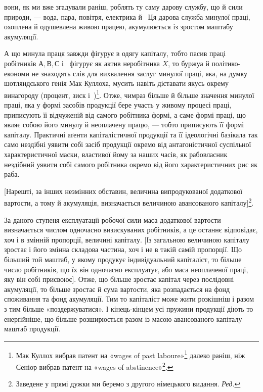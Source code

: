 \parcont{}  %
вони, як ми вже згадували раніш, роблять ту саму дарову службу,
що й сили природи, — вода, пара, повітря, електрика й~
Ця дарова служба минулої праці, охоплена й одушевлена живою
працею, акумулюється із зростом маштабу акумуляції.

А що минула праця завжди фігурує в одягу капіталу, тобто
пасив праці робітників $А, В, С$ і~ фігурує як актив неробітника
$X$, то буржуа й політико-економи не знаходять слів
для вихвалення заслуг минулої праці, яка, на думку шотляндського
генія Мак Куллоха, мусить навіть діставати якусь окрему
винагороду (процент, зиск і~)\footnote{
Мак Куллох вибрав патент на «wages of past laboure»\footnote*{
винагороду за минулу працю. \emph{Ред.}
} далеко раніш, ніж Сеніор вибрав патент на «wages of abstinence»\footnote*{
винагороду за поздержливість. \emph{Ред.}
}.
}. Отже, чимраз більше й
більше значення минулої праці, яка у формі засобів продукції
бере участь у живому процесі праці, приписують її відчуженій
від самого робітника формі, а саме формі праці, що являє собою
його минулу й неоплачену працю, — тобто приписують її
формі капіталу. Практичні аґенти капіталістичної продукції
та її ідеологічні базікала так само нездібні уявити собі засіб
продукції окремо від антагоністичної суспільної характеристичної
маски, властивої йому за наших часів, як рабовласник
нездібний уявити собі самого робітника окремо від його характеристичних
рис як раба.

[Нарешті, за інших незмінних обставин, величина випродукованої
додаткової вартости, а тому й акумуляція, визначається
величиною авансованого капіталу]\footnote*{Заведене у прямі дужки ми беремо з другого німецького видання.
\emph{Ред.}}.

За даного ступеня експлуатації робочої сили маса додаткової
вартости визначається числом одночасно визискуваних робітників,
а це останнє відповідає, хоч і в змінній пропорції, величині
капіталу. [Із загальною величиною капіталу зростає і його
змінна складова частина, хоч і не в такій самій пропорції. Що
більший той маштаб, у якому продукує індивідуальний капіталіст,
то більше число робітників, що їх він одночасно експлуатує,
або маса неоплаченої праці, яку він собі присвоює]. Отже,
що більше зростає капітал через послідовні акумуляції, то більше
зростає й сума вартости, яка розпадається на фонд споживання
та фонд акумуляції. Тим то капіталіст може жити розкішніш
і разом з тим більше «поздержуватися». І кінець-кінцем усі
пружини продукції діють то енерґійніше, що більше розширюється
разом із масою авансованого капіталу маштаб продукції.
